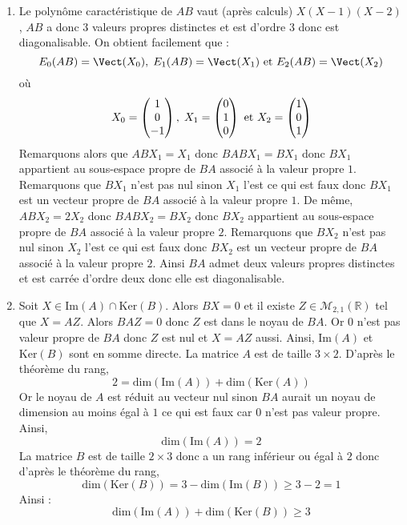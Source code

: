\documentclass[a4paper,twoside,french,10pt]{VcCours}
\begin{document}
\begin{enumerate}
\item Le polynôme caractéristique de $AB$ vaut (après calculs) $X(X-1)(X-2)$, $AB$ a donc $3$ valeurs propres distinctes et est d'ordre $3$ donc est diagonalisable. On obtient facilement que :
$$ E_{0}(AB) = \Vect(X_0), \; E_{1}(AB) = \Vect(X_1) \hbox{ et } E_{2}(AB) = \Vect(X_2)$$
où 
$$ X_0 = \begin{pmatrix}
1 \\
0 \\
-1
\end{pmatrix},  \; X_1 = \begin{pmatrix}
0 \\
1 \\
0
\end{pmatrix} \hbox{ et } X_2 = \begin{pmatrix}
1 \\
0 \\
1
\end{pmatrix}$$
Remarquons alors que $ABX_1=X_1$ donc $BABX_1=BX_1$ donc $BX_1$ appartient au sous-espace propre de $BA$ associé à la valeur propre $1$. Remarquons que $BX_1$ n'est pas nul sinon $X_1$ l'est ce qui est faux donc $BX_1$ est un vecteur propre de $BA$ associé à la valeur propre $1$. De même, $ABX_2=2X_2$ donc $BABX_2=BX_2$ donc $BX_2$ appartient au sous-espace propre de $BA$ associé à la valeur propre $2$. Remarquons que $BX_2$ n'est pas nul sinon $X_2$ l'est ce qui est faux donc $BX_2$ est un vecteur propre de $BA$ associé à la valeur propre $2$.  Ainsi $BA$ admet deux valeurs propres distinctes et est carrée d'ordre deux donc elle est diagonalisable.
\item Soit $X \in \textrm{Im}(A) \cap \textrm{Ker}(B)$. Alors $BX=0$ et il existe $Z \in \mathcal{M}_{2,1}(\mathbb{R})$ tel que $X=AZ$. Alors $BAZ=0$ donc $Z$ est dans le noyau de $BA$. Or $0$ n'est pas valeur propre de $BA$ donc $Z$ est nul et $X=AZ$ aussi. Ainsi, $\textrm{Im}(A)$ et $\textrm{Ker}(B)$ sont en somme directe. La matrice $A$ est de taille $3 \times 2$. D'après le théorème du rang,
$$ 2 = \textrm{dim}(\textrm{Im}(A)) + \textrm{dim}(\textrm{Ker}(A))$$
Or le noyau de $A$ est réduit au vecteur nul sinon $BA$ aurait un noyau de dimension au moins égal à $1$ ce qui est faux car $0$ n'est pas valeur propre. Ainsi,
$$\textrm{dim}(\textrm{Im}(A))  = 2$$
La matrice $B$ est de taille $2 \times 3$ donc a un rang inférieur ou égal à $2$ donc d'après le théorème du rang,
$$ \textrm{dim}(\textrm{Ker}(B)) = 3- \textrm{dim}(\textrm{Im}(B)) \geq 3-2 = 1$$
Ainsi :
$$ \textrm{dim}(\textrm{Im}(A)) + \textrm{dim}(\textrm{Ker}(B)) \geq 3$$

\end{enumerate}
\end{document}
